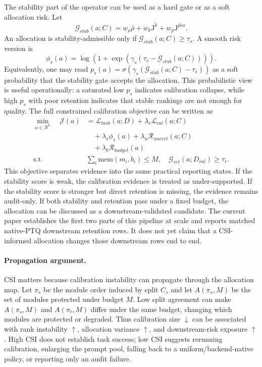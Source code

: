\documentclass[letterpaper]{article}
\newcommand{\Jacc}{\mathrm{J}}
\begin{document}
The stability part of the operator can be used as a hard gate or as a soft
allocation risk. Let
\begin{equation}
\mathcal{G}_{stab}(a;C)=
w_{\rho}\bar{\rho}+w_k\overline{\Jacc^k}+w_p\overline{\Jacc^{pos}}.
\end{equation}
An allocation is stability-admissible only if
$\mathcal{G}_{stab}(a;C)\geq\tau_s$. A smooth risk version is
\begin{equation}
\phi_s(a)=\log\!\left(1+\exp\left(\gamma_s(\tau_s-\mathcal{G}_{stab}(a;C))\right)\right).
\end{equation}
Equivalently, one may read
$p_s(a)=\sigma(\gamma_s(\mathcal{G}_{stab}(a;C)-\tau_s))$ as a soft
probability that the stability gate accepts the allocation. This probabilistic
view is useful operationally: a saturated low $p_s$ indicates calibration
collapse, while high $p_s$ with poor retention indicates that stable rankings
are not enough for quality.
The full constrained calibration objective can be written as
\begin{align}
\min_{a\in\mathcal{B}^L}\quad
\mathcal{J}(a) &=
\mathcal{L}_{task}(a;D)+\lambda_c\mathcal{L}_{cal}(a;C)
\nonumber\\
&\quad + \lambda_s\phi_s(a)+\lambda_u\mathcal{R}_{uncert}(a;C)
\nonumber\\
&\quad + \lambda_b\mathcal{R}_{budget}(a)\\
\text{s.t.}\quad
&\sum_i \mathrm{mem}(m_i,b_i)\leq M,\quad
\mathcal{G}_{ret}(a;D_{val})\geq\tau_r.
\end{align}
This objective separates evidence into the same practical reporting states. If
the stability score is weak, the calibration evidence is treated as
under-supported. If the stability score is stronger but direct retention is
missing, the evidence remains audit-only. If both stability and retention pass
under a fixed budget, the allocation can be discussed as a downstream-validated
candidate. The current paper establishes the first two parts of this pipeline at
scale and reports matched native-PTQ downstream retention rows. It does not yet
claim that a CSI-informed allocation changes those downstream rows end to end.

\paragraph{Propagation argument.}
CSI matters because calibration instability can propagate through the allocation
map. Let $\pi_s$ be the module order induced by split $C_s$ and let
$A(\pi_s,M)$ be the set of modules protected under budget $M$. Low split
agreement can make $A(\pi_s,M)$ and $A(\pi_t,M)$ differ under the same budget,
changing which modules are protected or degraded. Thus calibration size
$\downarrow$ can be associated with rank instability $\uparrow$, allocation
variance $\uparrow$, and downstream-risk exposure $\uparrow$. High CSI does not
establish task success; low CSI suggests rerunning calibration, enlarging the
prompt pool, falling back to a uniform/backend-native policy, or reporting only
an audit failure.
\end{document}
